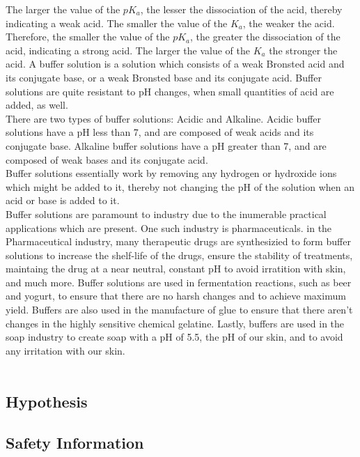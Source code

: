 \documentclass{article}
\begin{document}
\noindent
The larger the value of the $pK_a$, the lesser the dissociation of the acid, thereby indicating a weak acid. The smaller the value of the $K_a$, the weaker the acid. Therefore, the smaller the value of the $pK_a$, the greater the dissociation of the acid, indicating a strong acid. The larger the value of the $K_a$ the stronger the acid.
A buffer solution is a solution which consists of a weak Bronsted acid and its conjugate base, or a weak Bronsted base and its conjugate acid. Buffer solutions are quite resistant to pH changes, when small quantities of acid are added, as well. \\
\noindent
There are two types of buffer solutions: Acidic and Alkaline. Acidic buffer solutions have a pH less than 7, and are composed of weak acids and its conjugate base. Alkaline buffer solutions have a pH greater than 7, and are composed of weak bases and its conjugate acid. \\
\noindent
Buffer solutions essentially work by removing any hydrogen or hydroxide ions which might be added to it, thereby not changing the pH of the solution when an acid or base is added to it. \\
\noindent
Buffer solutions are paramount to industry due to the inumerable practical applications which are present. One such industry is pharmaceuticals. in the Pharmaceutical industry, many therapeutic drugs are synthesizied to form buffer solutions to increase the shelf-life of the drugs, ensure the stability of treatments,  maintaing the drug at a near neutral, constant pH to avoid irratition with skin, and much more. 
Buffer solutions are used in fermentation reactions, such as beer and yogurt, to ensure that there are no harsh changes and to achieve maximum yield. Buffers are also used in the manufacture of glue to ensure that there aren't changes in the highly sensitive chemical gelatine. Lastly, buffers are used in the soap industry to create soap with a pH of 5.5, the pH of our skin, and to avoid any irritation with our skin. \\\\
\noindent

\subsection*{Hypothesis}%

\subsection*{Safety Information}%
\end{document}
